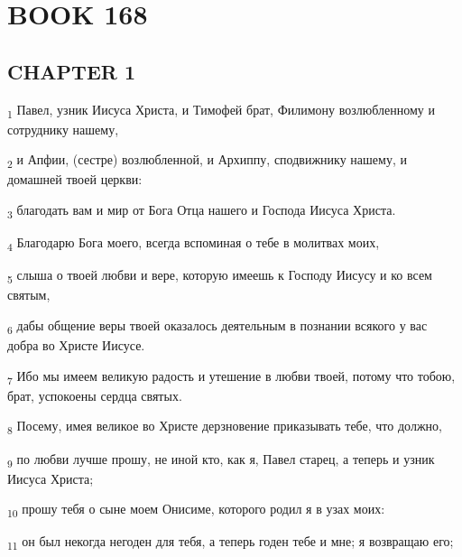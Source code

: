 \section{BOOK 168}
\subsection{CHAPTER 1}
\begin{tcolorbox}
\textsubscript{1} Павел, узник Иисуса Христа, и Тимофей брат, Филимону возлюбленному и сотруднику нашему,
\end{tcolorbox}
\begin{tcolorbox}
\textsubscript{2} и Апфии, (сестре) возлюбленной, и Архиппу, сподвижнику нашему, и домашней твоей церкви:
\end{tcolorbox}
\begin{tcolorbox}
\textsubscript{3} благодать вам и мир от Бога Отца нашего и Господа Иисуса Христа.
\end{tcolorbox}
\begin{tcolorbox}
\textsubscript{4} Благодарю Бога моего, всегда вспоминая о тебе в молитвах моих,
\end{tcolorbox}
\begin{tcolorbox}
\textsubscript{5} слыша о твоей любви и вере, которую имеешь к Господу Иисусу и ко всем святым,
\end{tcolorbox}
\begin{tcolorbox}
\textsubscript{6} дабы общение веры твоей оказалось деятельным в познании всякого у вас добра во Христе Иисусе.
\end{tcolorbox}
\begin{tcolorbox}
\textsubscript{7} Ибо мы имеем великую радость и утешение в любви твоей, потому что тобою, брат, успокоены сердца святых.
\end{tcolorbox}
\begin{tcolorbox}
\textsubscript{8} Посему, имея великое во Христе дерзновение приказывать тебе, что должно,
\end{tcolorbox}
\begin{tcolorbox}
\textsubscript{9} по любви лучше прошу, не иной кто, как я, Павел старец, а теперь и узник Иисуса Христа;
\end{tcolorbox}
\begin{tcolorbox}
\textsubscript{10} прошу тебя о сыне моем Онисиме, которого родил я в узах моих:
\end{tcolorbox}
\begin{tcolorbox}
\textsubscript{11} он был некогда негоден для тебя, а теперь годен тебе и мне; я возвращаю его;
\end{tcolorbox}
